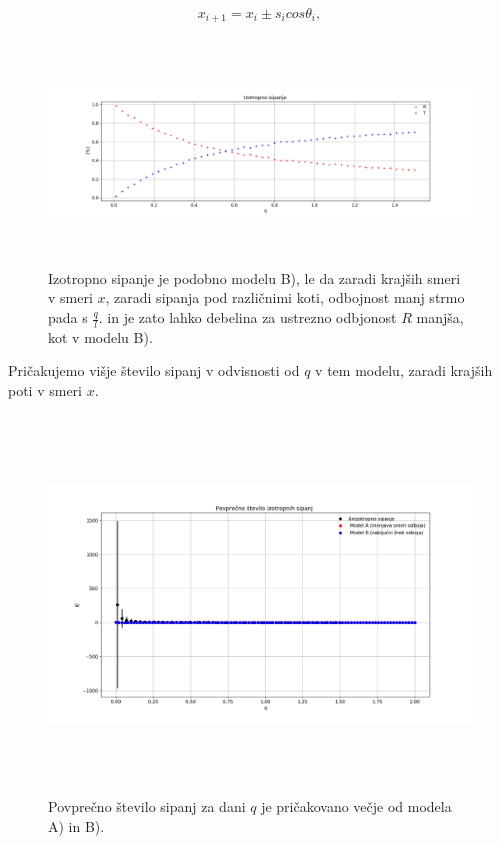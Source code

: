 \documentclass[11pt, a4paper]{article}
\begin{document}
\begin{equation}
x_{i+1} = x_i \pm s_i cos \theta_i,
\end{equation} 
\begin{figure}[H]
\hspace*{-2.5cm}  
  \includegraphics[width=22cm, height = 6cm]{tretja_izotropno.png}
 \caption{Izotropno sipanje je podobno modelu B), le da zaradi krajših smeri v smeri $x$, zaradi sipanja pod različnimi koti, odbojnost manj strmo pada s $\frac{q }{l}$. in je zato lahko debelina za ustrezno odbjonost $R$ manjša, kot v modelu B).}
\end{figure}
Pričakujemo višje število sipanj v odvisnosti od $q$ v tem modelu, zaradi krajših poti v smeri $x$.
\begin{figure}[H]
\hspace*{-3cm}  
  \includegraphics[width=22cm, height = 10cm]{tretja_izotropno2.png}
 \caption{Povprečno število sipanj za dani $q$ je pričakovano večje od modela A) in B).}
\end{figure}
\end{document}
